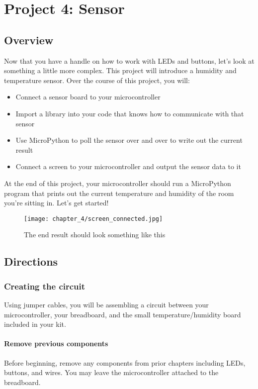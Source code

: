\chapter{Project 4: Sensor}

\section{Overview}
Now that you have a handle on how to work with LEDs and buttons, let's look at something a little more complex. This project will introduce a humidity and temperature sensor. Over the course of this project, you will:
\begin{itemize}
    \item Connect a sensor board to your microcontroller
    \item Import a library into your code that knows how to communicate with that sensor
    \item Use MicroPython to poll the sensor over and over to write out the current result
    \item Connect a screen to your microcontroller and output the sensor data to it
\end{itemize}
At the end of this project, your microcontroller should run a MicroPython program that prints out the current temperature and humidity of the room you're sitting in. Let's get started!
\begin{figure}[H]
\centering
    \texttt{[image: chapter\_4/screen\_connected.jpg]}
    \caption{The end result should look something like this}
\end{figure}

\pagebreak

\section{Directions}

\subsection{Creating the circuit}
Using jumper cables, you will be assembling a circuit between your microcontroller, your breadboard, and the small temperature/humidity board included in your kit.

\subsubsection{Remove previous components}
Before beginning, remove any components from prior chapters including LEDs, buttons, and wires. You may leave the microcontroller attached to the breadboard.

